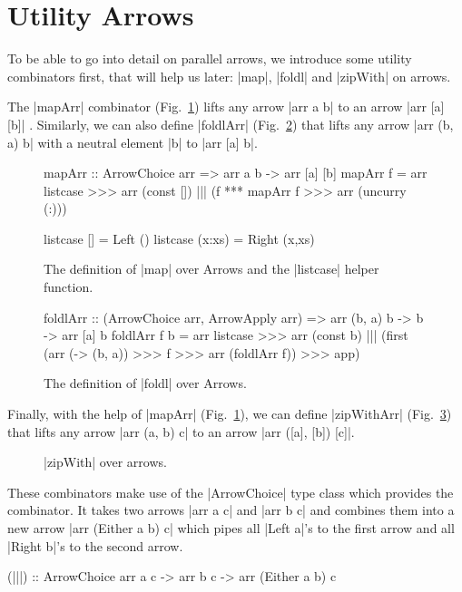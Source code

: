 \section{Utility Arrows}\label{utilfns}
To be able to go into detail on parallel arrows, we introduce some utility combinators first, that will help us later: |map|, |foldl| and |zipWith| on arrows.

The |mapArr| combinator (Fig.~\ref{fig:mapArr}) lifts any arrow |arr a
b| to an arrow |arr [a] [b]| \cite{programming_with_arrows}. 
Similarly, we can also define |foldlArr| (Fig.~\ref{fig:foldlArr}) that lifts any arrow |arr (b, a) b| with a neutral element |b| to |arr [a] b|.

\begin{figure}[h]
\begin{code}
mapArr :: ArrowChoice arr => arr a b -> arr [a] [b]
mapArr f =
	arr listcase >>>
	arr (const []) ||| (f *** mapArr f >>> arr (uncurry (:)))

listcase [] = Left ()
listcase (x:xs) = Right (x,xs)
\end{code}
\caption{The definition of |map| over Arrows and the |listcase| helper
function.}
\label{fig:mapArr}
\end{figure}

\begin{figure}[h]
\begin{code}
foldlArr :: (ArrowChoice arr, ArrowApply arr) => arr (b, a) b -> b -> arr [a] b
foldlArr f b =
	arr listcase >>>
	arr (const b) |||
		(first (arr (\a -> (b, a)) >>> f >>> arr (foldlArr f)) >>> app)
\end{code}
\caption{The definition of |foldl| over Arrows.}
\label{fig:foldlArr}
\end{figure}

Finally, with the help of |mapArr| (Fig.~\ref{fig:mapArr}), we can define |zipWithArr|  (Fig.~\ref{fig:zipWithArr}) that lifts any arrow |arr (a, b) c| to an arrow |arr ([a], [b]) [c]|.
\begin{figure}[h]
\caption{|zipWith| over arrows.}
\label{fig:zipWithArr}
\end{figure}

These combinators make use of the |ArrowChoice| type class which provides the \pipepipepipe combinator. It takes two arrows |arr a c| and |arr b c| and combines them into a new arrow |arr (Either a b) c| which pipes all |Left a|'s to the first arrow and all |Right b|'s to the second arrow.
\begin{code}
(|||) :: ArrowChoice arr a c -> arr b c -> arr (Either a b) c
\end{code}

